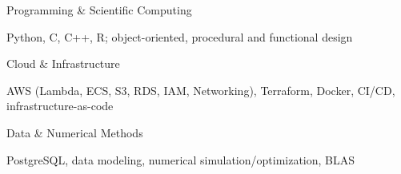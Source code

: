





\begin{cvskills}    
  \cvskill
  {Programming \& Scientific Computing}{\begin{minipage}[t]{0.7\textwidth}
    Python, C, C++, R; object-oriented, procedural and functional design
  \end{minipage}}

  \cvskill
  {Cloud \& Infrastructure}{\begin{minipage}[t]{0.7\textwidth}
    AWS (Lambda, ECS, S3, RDS, IAM, Networking), Terraform, Docker, CI/CD, infrastructure-as-code
  \end{minipage}}

  \cvskill
  {Data \& Numerical Methods}{\begin{minipage}[t]{0.7\textwidth}
    PostgreSQL, data modeling, numerical simulation/optimization, BLAS
  \end{minipage}}
\end{cvskills}